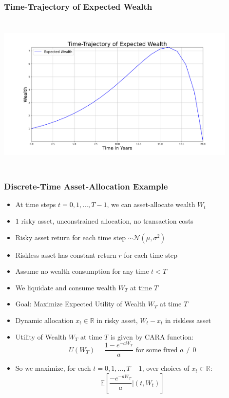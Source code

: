 \documentclass[handout]{beamer}
\begin{document}
\begin{frame}
\frametitle{Time-Trajectory of Expected Wealth}
\includegraphics[width=12cm, height=8cm]{wealth_trajectory.png}
\end{frame}

\begin{frame}
\frametitle{Discrete-Time Asset-Allocation Example}
\pause
\begin{itemize}[<+->]
\item At time steps $t = 0, 1, \ldots, T-1$, we can asset-allocate wealth $W_t$
\item 1 risky asset, unconstrained allocation, no transaction costs
\item Risky asset return for each time step $\sim \mathcal{N}(\mu, \sigma^2)$
\item Riskless asset has constant return $r$ for each time step
\item Assume no wealth consumption for any time $t < T$
\item We liquidate and consume wealth $W_T$ at time $T$
\item Goal:  Maximize Expected Utility of Wealth $W_T$ at time $T$
\item Dynamic allocation $x_t \in \mathbb{R}$ in risky asset, $W_t - x_t$ in riskless asset
\item Utility of Wealth $W_T$ at time $T$ is given by CARA function:
$$U(W_T) = \frac {1 - e^{-a W_T}} {a} \text{ for some fixed } a \neq 0$$
\item So we maximize, for each $t=0, 1, \ldots, T-1$, over choices of $x_t \in \mathbb{R}$:
$$\mathbb{E}[\frac {- e^{-a W_T}} a | (t, W_t)]$$
\end{itemize}
\end{frame}
\end{document}

